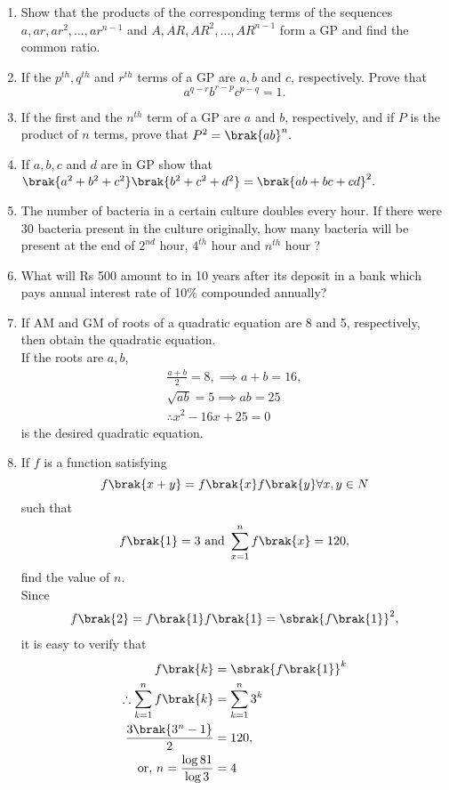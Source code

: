 \begin{enumerate}[label=\thesubsection.\arabic*.,ref=\thesubsection.\theenumi]
\item Show that the products of the corresponding terms of the sequences $a, ar, ar^2,\dots,  ar^{n-1}$ and $A, AR, AR^2,\dots,  AR^{n -1}$ form a GP  and find the common ratio.
\item If the $p^{th}, q^{th}$ and $r^{th}$ terms of a GP  are $a, b$ and $c$, respectively. Prove that 
$$a^{q-r} b^{r-p} c^{p-q} = 1.$$
\item If the first and the $n^{th}$ term of a GP  are $a$ and $b$, respectively, and if $P$ is the product of $n$ terms, prove that $P^2 = \brak{ab}^n.$
\item If $a, b, c$ and $d$ are in GP  show that $\brak{a^2 + b^2 + c^2}\brak{b^2 + c^2 + d^2} = \brak{ab + bc + cd}^2.$
\item The number of bacteria in a certain culture doubles every hour. If there were 30 bacteria present in the culture originally, how many bacteria will be present at the end of $2^{nd}$ hour, 
$4^{th}$ hour and $n^{th}$ hour ?
\item What will Rs 500 amount to in 10 years after its deposit in a bank which pays annual interest rate of 10\% compounded annually?
\item If AM  and GM  of roots of a quadratic equation are 8 and 5, respectively, then obtain the quadratic equation.
	\\
	\solution If the roots are $a, b$,
\begin{align}
	\frac{a+b}{2} = 8, \implies a+b = 16,
	\\
	\sqrt{ab} = 5 \implies ab = 25
	\\
	\therefore 
	x^2-16x + 25=0
\end{align}
is the desired quadratic equation.
\item If $f$ is a function satisfying $$f\brak{x +y} = f\brak{x} f\brak{y} \forall x,y \in N$$ such that 
	$$f\brak{1} = 3\text{ and }\sum_{x = 1}^n f\brak{x} = 120,$$ find the value of $n$.
	\\
	\solution Since 
\begin{align}
	f\brak{2}=
	f\brak{1}
	f\brak{1}
	=
	\sbrak{f\brak{1}}^2,
\end{align}
it is easy to verify that
\begin{align}
	f\brak{k}&=
	\sbrak{f\brak{1}}^k
	\\
	\therefore
\sum_{k = 1}^n f\brak{k} 
&=
\sum_{k = 1}^n 3^{k} 
	\\
	\frac{3\brak{3^{n}-1}}{2} &= 120,
	\\
	\text{or, }
	n =\frac{\log 81}{\log 3} &= 4

\end{align}
\end{enumerate}
